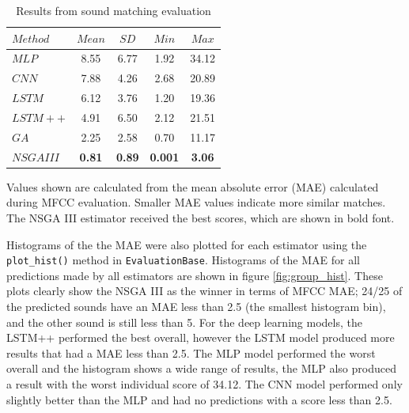 \begin{table}[t]
\centering
\caption{Results from sound matching evaluation}
\label{tbl:sound_match_eval}
\begin{threeparttable}
\begin{tabular}{l|cccc}
\toprule
$Method$ & $Mean$ & $SD$ & $Min$ & $Max$ \\
\midrule
$MLP$ & 8.55 & 6.77 & 1.92 & 34.12 \\
$CNN$ & 7.88 & 4.26 & 2.68 & 20.89 \\
$LSTM$ & 6.12 & 3.76 & 1.20 & 19.36 \\
$LSTM++$ & 4.91 & 6.50 & 2.12 & 21.51 \\
$GA$ & 2.25 & 2.58 & 0.70 & 11.17 \\
$NSGA III$ & \textbf{0.81} & \textbf{0.89} & \textbf{0.001} & \textbf{3.06} \\
\bottomrule
\end{tabular}
\begin{tablenotes}
\footnotesize
\item Values shown are calculated from the mean absolute error (MAE) calculated during MFCC evaluation. Smaller MAE values indicate more similar matches. The NSGA III estimator received the best scores, which are shown in bold font.
\end{tablenotes}
\end{threeparttable}
\end{table}


Histograms of the the MAE were also plotted for each estimator using the \texttt{plot_hist()} method in \texttt{EvaluationBase}. Histograms of the MAE for all predictions made by all estimators are shown in figure \ref{fig:group_hist}. These plots clearly show the NSGA III as the winner in terms of MFCC MAE; 24/25 of the predicted sounds have an MAE less than 2.5 (the smallest histogram bin), and the other sound is still less than 5. For the deep learning models, the LSTM++ performed the best overall, however the LSTM model produced more results that had a MAE less than 2.5. The MLP model performed the worst overall and the histogram shows a wide range of results, the MLP also produced a result with the worst individual score of 34.12. The CNN model performed only slightly better than the MLP and had no predictions with a score less than 2.5.

